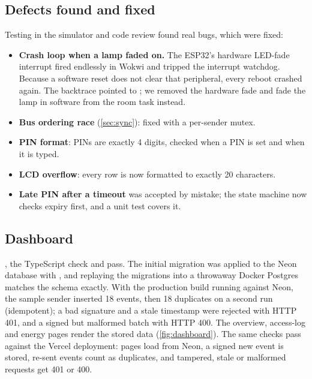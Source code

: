 \subsection{Defects found and fixed}
Testing in the simulator and code review found real bugs, which were fixed:
\begin{itemize}
  \item \textbf{Crash loop when a lamp faded on.} The ESP32's hardware LED-fade interrupt fired
        endlessly in Wokwi and tripped the interrupt watchdog. Because a software reset does not
        clear that peripheral, every reboot crashed again. The backtrace pointed to
        ; we removed the hardware fade and fade the lamp in software from the
        room task instead.
  \item \textbf{Bus ordering race} (\cref{sec:sync}): fixed with a per-sender mutex.
  \item \textbf{PIN format}: PINs are exactly 4 digits, checked when a PIN is set and when it is
        typed.
  \item \textbf{LCD overflow}: every row is now formatted to exactly 20 characters.
  \item \textbf{Late PIN after a timeout} was accepted by mistake; the state machine now checks
        expiry first, and a unit test covers it.
\end{itemize}

\subsection{Dashboard}
, the TypeScript check and  pass. The initial migration
was applied to the Neon database with , and replaying the migrations
into a throwaway Docker Postgres matches the schema exactly. With the production build running
against Neon, the sample sender inserted 18 events, then 18 duplicates on a second run
(idempotent); a bad signature and a stale timestamp were rejected with HTTP 401, and a signed but
malformed batch with HTTP 400. The overview, access-log and energy pages render the stored data
(\cref{fig:dashboard}). The same checks pass against the Vercel deployment: pages load from
Neon, a signed new event is stored, re-sent events count as duplicates, and tampered,
stale or malformed requests get 401 or 400.


